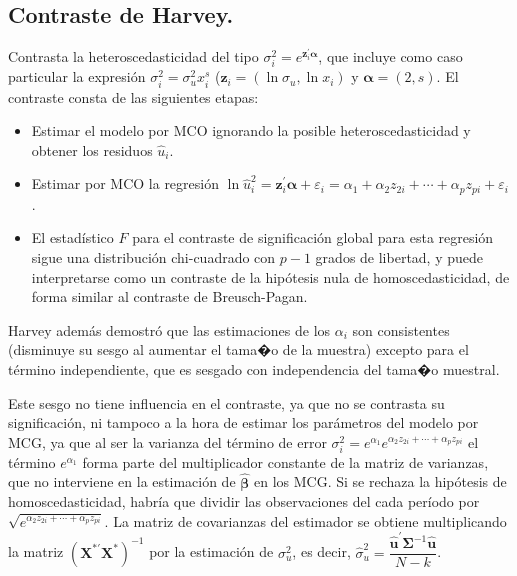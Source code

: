\subsection{Contraste de Harvey.}

Contrasta la heteroscedasticidad del tipo $\sigma_{i}^{2}=e^{\boldsymbol{z}_{i}^{\prime}\boldsymbol{\alpha}}$,
que incluye como caso particular la expresi\'on $\sigma_{i}^{2}=\sigma_{u}^{2}x_{i}^{s}$
($\boldsymbol{z}_{i}=\left(\ln\sigma_{u},\ln x_{i}\right)$ y $\boldsymbol{\alpha}=\left(2,s\right)$.
El contraste consta de las siguientes etapas:
\begin{itemize}
\item Estimar el modelo por MCO ignorando la posible heteroscedasticidad
y obtener los residuos $\hat{u}_{i}$.
\item Estimar por MCO la regresi\'on $\ln\hat{u}_{i}^{2}=\boldsymbol{z}_{i}^{\prime}\boldsymbol{\alpha}+\varepsilon_{i}=\alpha_{1}+\alpha_{2}z_{2i}+\cdots+\alpha_{p}z_{pi}+\varepsilon_{i}$.
\item El estad\'istico $F$ para el contraste de significaci\'on global para
esta regresi\'on sigue una distribuci\'on chi-cuadrado con $p-1$ grados
de libertad, y puede interpretarse como un contraste de la hip\'otesis
nula de homoscedasticidad, de forma similar al contraste de Breusch-Pagan.
\end{itemize}
Harvey adem\'as demostr\'o que las estimaciones de los $\alpha_{i}$ son
consistentes (disminuye su sesgo al aumentar el tama�o de la muestra)
excepto para el t\'ermino independiente, que es sesgado con independencia
del tama�o muestral.

Este sesgo no tiene influencia en el contraste, ya que no se contrasta
su significaci\'on, ni tampoco a la hora de estimar los par\'ametros del
modelo por MCG, ya que al ser la varianza del t\'ermino de error $\sigma_{i}^{2}=e^{\alpha_{1}}e^{\alpha_{2}z_{2i}+\cdots+\alpha_{p}z_{pi}}$
el t\'ermino $e^{\alpha_{1}}$ forma parte del multiplicador constante
de la matriz de varianzas, que no interviene en la estimaci\'on de $\hat{\boldsymbol{\beta}}$
en los MCG. Si se rechaza la hip\'otesis de homoscedasticidad, habr\'ia
que dividir las observaciones del cada per\'iodo por $\sqrt{e^{\alpha_{2}z_{2i}+\cdots+\alpha_{p}z_{pi}}}$.
La matriz de covarianzas del estimador se obtiene multiplicando la
matriz $\left(\boldsymbol{X}^{*\prime}\boldsymbol{X}^{*}\right)^{-1}$
por la estimaci\'on de $\sigma_{u}^{2}$, es decir, $\hat{\sigma}_{u}^{2}=\dfrac{\hat{\boldsymbol{u}}^{\prime}\boldsymbol{\Sigma}^{-1}\hat{\boldsymbol{u}}}{N-k}$.


